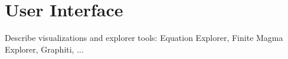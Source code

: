 
\section{User Interface}

Describe visualizations and explorer tools: Equation Explorer, Finite Magma Explorer, Graphiti, ...

